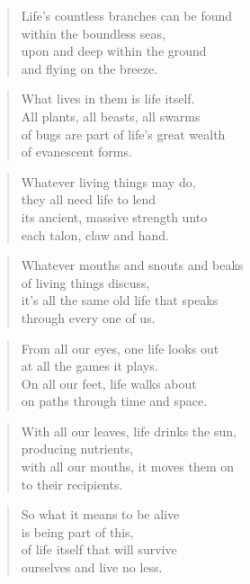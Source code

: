 \documentclass[10pt,a4paper]{article}
\begin{document}
\begin{multicols}{2}
\begin{verse}
Life’s countless branches can be found\\
within the boundless seas,\\
upon and deep within the ground\\
and flying on the breeze.
\end{verse}

\begin{verse}
What lives in them is life itself.\\
All plants, all beasts, all swarms\\
of bugs are part of life’s great wealth\\
of evanescent forms.
\end{verse}

\begin{verse}
Whatever living things may do,\\
they all need life to lend\\
its ancient, massive strength unto\\
each talon, claw and hand.
\end{verse}

\begin{verse}
Whatever mouths and snouts and beaks\\
of living things discuss,\\
it’s all the same old life that speaks\\
through every one of us.
\end{verse}

\begin{verse}
From all our eyes, one life looks out\\
at all the games it plays.\\
On all our feet, life walks about\\
on paths through time and space.
\end{verse}

\begin{verse}
With all our leaves, life drinks the sun,\\
producing nutrients,\\
with all our mouths, it moves them on\\
to their recipients.
\end{verse}

\begin{verse}
So what it means to be alive\\
is being part of this,\\
of life itself that will survive\\
ourselves and live no less.
\end{verse}


\end{multicols}
\end{document}
